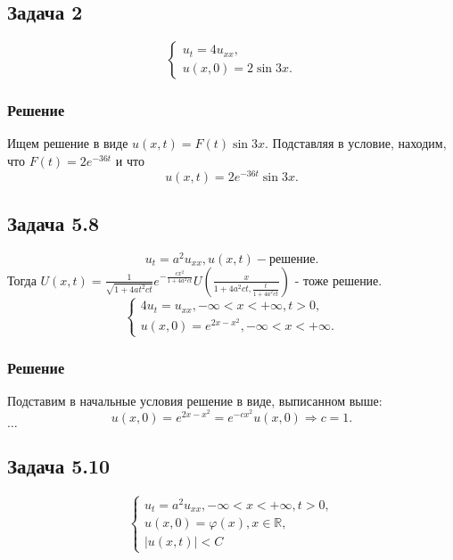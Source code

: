 \documentclass[11pt]{article}
\newcounter{th}\setcounter{th}{0}
\begin{document}
\subsection{Задача 2}
\label{sec:org3d1e896}
\begin{equation}
\begin{cases}
u_t = 4u_{xx}, \\
u(x, 0) = 2\sin 3x.
\end{cases}
\end{equation}
\subsubsection{Решение}
\label{sec:orge7cce0c}
Ищем решение в виде $u(x, t) = F(t)\sin 3x$. Подставляя в условие, находим, что $F(t) = 2e^{-36t}$ и что
\begin{equation}
u(x, t) = 2e^{-36t}\sin 3x.
\end{equation}
\subsection{Задача 5.8}
\label{sec:org80f3f68}
\begin{equation}
u_t = a^2u_{xx},
u(x, t) - { решение}.
\end{equation}
Тогда $U(x, t) = \frac1{\sqrt{1 + 4at^2ct}}e^{-\frac{cx^2}{1 + 4a^2ct}}U\left(\frac{x}{1 + 4a^2ct, \frac{t}{1 + 4a^2ct}}\right)$ - тоже решение.
\begin{equation}
\begin{cases}
4u_t = u_{xx}, -\infty < x < +\infty, t > 0, \\
u(x, 0) = e^{2x - x^2}, -\infty < x < +\infty.
\end{cases}
\end{equation}
\subsubsection{Решение}
\label{sec:orgb8a2378}
Подставим в начальные условия решение в виде, выписанном выше:
\begin{equation}
u(x, 0) = e^{2x - x^2} = e^{-cx^2}u(x, 0) \Rightarrow c = 1.
\end{equation}
$\ldots$
\subsection{Задача 5.10}
\label{sec:org586f655}
\begin{equation}
\begin{cases}
u_t = a^2u_{xx}, -\infty < x < +\infty, t > 0, \\
u(x, 0) = \varphi(x), x \in \mathbb{R}, \\
|u(x, t)| < C
\end{cases}
\end{equation}
\end{document}
